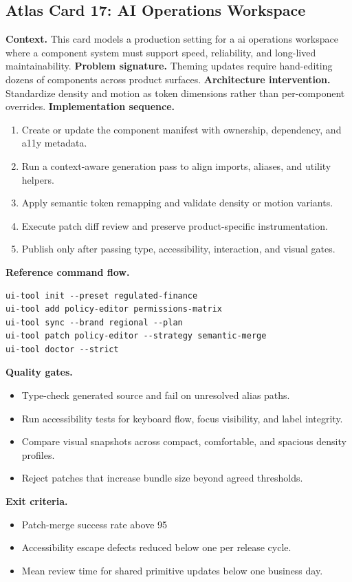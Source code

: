 \subsection*{Atlas Card 17: AI Operations Workspace}
\textbf{Context.} This card models a production setting for a ai operations workspace where a component system must support speed, reliability, and long-lived maintainability.
\textbf{Problem signature.} Theming updates require hand-editing dozens of components across product surfaces.
\textbf{Architecture intervention.} Standardize density and motion as token dimensions rather than per-component overrides.
\textbf{Implementation sequence.}
\begin{enumerate}[leftmargin=*, itemsep=0.28em]
  \item Create or update the component manifest with ownership, dependency, and a11y metadata.
  \item Run a context-aware generation pass to align imports, aliases, and utility helpers.
  \item Apply semantic token remapping and validate density or motion variants.
  \item Execute patch diff review and preserve product-specific instrumentation.
  \item Publish only after passing type, accessibility, interaction, and visual gates.
\end{enumerate}
\textbf{Reference command flow.}
\begin{verbatim}
ui-tool init --preset regulated-finance
ui-tool add policy-editor permissions-matrix
ui-tool sync --brand regional --plan
ui-tool patch policy-editor --strategy semantic-merge
ui-tool doctor --strict
\end{verbatim}
\textbf{Quality gates.}
\begin{itemize}[leftmargin=*, itemsep=0.24em]
  \item Type-check generated source and fail on unresolved alias paths.
  \item Run accessibility tests for keyboard flow, focus visibility, and label integrity.
  \item Compare visual snapshots across compact, comfortable, and spacious density profiles.
  \item Reject patches that increase bundle size beyond agreed thresholds.
\end{itemize}
\textbf{Exit criteria.}
\begin{itemize}[leftmargin=*, itemsep=0.24em]
  \item Patch-merge success rate above 95%
  \item Accessibility escape defects reduced below one per release cycle.
  \item Mean review time for shared primitive updates below one business day.
\end{itemize}
\clearpage

